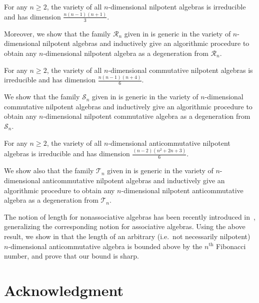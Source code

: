 \documentclass{commat}
\begin{document}
\begin{theorem}
	For any $n\ge 2$, the variety of all $n$-dimensional nilpotent algebras is irreducible and has dimension $\frac{n(n-1)(n+1)}{3}$.
\end{theorem}

Moreover, we show that the family $\mathcal{R}_n$ given in \cite[Def.\ 10]{KKL23} is generic in the variety of $n$-dimensional nilpotent algebras and inductively give an algorithmic procedure to obtain any $n$-dimensional nilpotent algebra as a degeneration from $\mathcal{R}_n$. 


\begin{theorem}
	For any $n\ge 2$, the variety of all $n$-dimensional commutative nilpotent algebras is irreducible and has dimension $\frac{n(n-1)(n+4)}{6}$.
\end{theorem}

We show that the family $\mathcal{S}_n$ given in \cite[Def.\ 15]{KKL23} is generic in the variety of $n$-dimensional commutative nilpotent algebras and inductively give an algorithmic procedure to obtain any $n$-dimensional nilpotent commutative algebra as a degeneration from $\mathcal{S}_n$. 


\begin{theorem}
	For any $n\ge 2$, the variety of all $n$-dimensional anticommutative nilpotent algebras is irreducible and has dimension $\frac{(n-2)(n^2+2n+3)}{6}$.
\end{theorem}


We show also that the family $\mathcal{T}_n$  given in \cite[Def.\ 33]{KKL23} is generic in the variety of $n$-dimensional anticommutative nilpotent algebras and inductively give an algorithmic procedure to obtain any $n$-dimensional nilpotent anticommutative algebra as a degeneration from $\mathcal{T}_n$. 



The notion of length for nonassociative algebras has been recently introduced in~\cite{GK20}, generalizing the corresponding notion for associative algebras. Using the above result, we show in \cite[Cor.\ 39]{KKL23} that the length of an arbitrary (i.e.\ not necessarily nilpotent) $n$-dimensional anticommutative algebra is bounded above by the $n^{\text{th}}$ Fibonacci number, and prove that our bound is sharp.

\section*{Acknowledgment}
\end{document}

